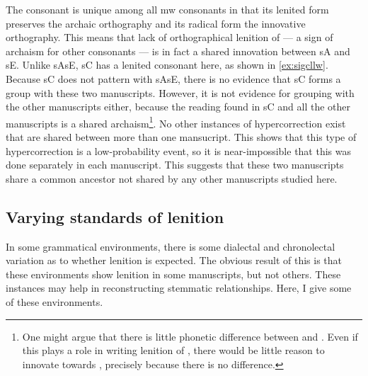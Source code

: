 The consonant  is unique among all \gls{mw} consonants in that its lenited form preserves the archaic orthography and its radical form the innovative orthography. This means that lack of orthographical lenition of  --- a sign of archaism for other consonants --- is in fact a shared innovation between \gls{sA} and \gls{sE}. Unlike \gls{sA}\gls{sE}, \gls{sC} has a lenited consonant here, as shown in \ref{ex:sigcllw}.
Because \gls{sC} does not pattern with \gls{sA}\gls{sE}, there is no evidence that \gls{sC} forms a group with these two manuscripts. However, it is not  evidence for grouping with the other manuscripts either, because the reading   found in \gls{sC} and all the other manuscripts is a shared archaism\footnote{One might argue that there is little phonetic difference between  and . Even if this plays a role in writing lenition of , there would be little reason to innovate towards , precisely because there is no difference.}. No other instances of hypercorrection exist that are shared between more than one mansucript.  This shows that this type of hypercorrection is a low-probability event, so it is  near-impossible that this was done separately in each manuscript.  This suggests that these two manuscripts share a common ancestor not shared by any other manuscripts studied here.


\subsection{Varying standards of lenition}
\label{sec:object-lenition}
In some grammatical environments, there is some dialectal and chronolectal variation as to whether lenition is expected. The obvious result of this is that these environments show lenition in some manuscripts, but not others. These instances may help in reconstructing stemmatic relationships. Here, I give some of these environments.

